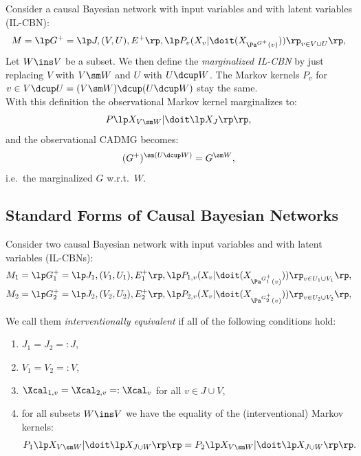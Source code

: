 \begin{Def}
    Consider a causal Bayesian network with input variables and with latent variables (IL-CBN): 
     \[ M= \lp G^+=\lp J,(V,U),E^+ \rp, \lp P_v ( X_v|\doit( X_{\Pa^{G^+}(v)})) \rp_{v \in V \cup U} \rp,  \]
    Let $W \ins V$ be a subset.
    We then define the \emph{marginalized IL-CBN} by just replacing $V$ with $V \sm W$ and $U$ with $U \dcup W$. 
    The Markov kernels $P_v$ for $v \in V \dcup U = (V \sm W) \dcup (U \dcup W)$ stay the same.\\
    With this definition the observational Markov kernel marginalizes to:
    \[ P\lp X_{V\sm W}|\doit\lp X_J\rp\rp,  \]
    and the observational CADMG becomes:
    \[ (G^+)^{\sm (U \dcup W)} = G^{\sm W},\]
    i.e.\ the marginalized $G$ w.r.t.\ $W$.
\end{Def}

\subsection{Standard Forms of Causal Bayesian Networks}

\begin{Def}
    Consider two  causal Bayesian network with input variables and with latent variables (IL-CBNs):
    \begin{align*}
        M_1 &= \lp G^+_1=\lp J_1,(V_1,U_1),E^+_1 \rp, \lp P_{1,v}( X_v|\doit( X_{\Pa^{G^+_1}(v)})) \rp_{v \in U_1 \cup V_1} \rp,\\
        M_2 &= \lp G^+_2=\lp J_2,(V_2,U_2),E^+_2 \rp, \lp P_{2,v} ( X_v|\doit( X_{\Pa^{G^+_2}(v)})) \rp_{v \in U_2 \cup V_2} \rp,
    \end{align*}

    We call them \emph{interventionally equivalent} if all of the following conditions hold:
    \begin{enumerate}
        \item $J_1 = J_2 =:J$,
        \item $V_1 = V_2 =:V$,
        \item $\Xcal_{1,v} = \Xcal_{2,v} =: \Xcal_v$ for all $v \in J \cup V$,
        \item for all subsets $W \ins V$ we have the equality of the (interventional) Markov kernels:
            \[P_1\lp X_{V \sm W}| \doit\lp X_{J \cup W} \rp\rp  = P_2\lp X_{V\sm W}| \doit\lp X_{J \cup W} \rp\rp.\]
    \end{enumerate}
\end{Def}


